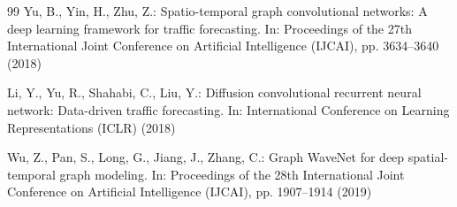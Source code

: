 \documentclass[pdflatex,sn-mathphys-num]{sn-jnl}
\theoremstyle{thmstyleone}
\theoremstyle{thmstyletwo}
\theoremstyle{thmstylethree}
\begin{document}
\begin{thebibliography}{99}
Yu, B., Yin, H., Zhu, Z.: Spatio-temporal graph convolutional networks: A deep learning framework for traffic forecasting. In: Proceedings of the 27th International Joint Conference on Artificial Intelligence (IJCAI), pp. 3634--3640 (2018)

Li, Y., Yu, R., Shahabi, C., Liu, Y.: Diffusion convolutional recurrent neural network: Data-driven traffic forecasting. In: International Conference on Learning Representations (ICLR) (2018)

Wu, Z., Pan, S., Long, G., Jiang, J., Zhang, C.: Graph WaveNet for deep spatial-temporal graph modeling. In: Proceedings of the 28th International Joint Conference on Artificial Intelligence (IJCAI), pp. 1907--1914 (2019)
\end{thebibliography}
\end{document}
